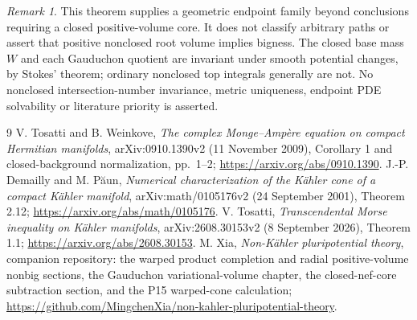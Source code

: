 \documentclass[11pt]{article}
\theoremstyle{remark}\newtheorem{remark}[theorem]{Remark}
\begin{document}
\begin{remark}
This theorem supplies a geometric endpoint family beyond conclusions
requiring a closed positive-volume core. It does not classify arbitrary
paths or assert that positive nonclosed root volume implies bigness.
The closed base mass $W$ and each Gauduchon quotient are invariant under
smooth potential changes, by Stokes' theorem; ordinary nonclosed top
integrals generally are not. No nonclosed intersection-number invariance, metric uniqueness,
endpoint PDE solvability or literature priority is asserted.
\end{remark}
\begin{thebibliography}{9}
 V. Tosatti and B. Weinkove, \emph{The complex Monge--Amp\`ere
equation on compact Hermitian manifolds}, arXiv:0910.1390v2
(11 November 2009), Corollary 1 and closed-background normalization,
pp.~1--2; \url{https://arxiv.org/abs/0910.1390}.
 J.-P. Demailly and M. P\u{a}un,
\emph{Numerical characterization of the K\"ahler cone of a compact
K\"ahler manifold}, arXiv:math/0105176v2 (24 September 2001),
Theorem 2.12; \url{https://arxiv.org/abs/math/0105176}.
 V. Tosatti, \emph{Transcendental Morse inequality on
K\"ahler manifolds}, arXiv:2608.30153v2 (8 September 2026),
Theorem 1.1; \url{https://arxiv.org/abs/2608.30153}.
 M. Xia, \emph{Non-K\"ahler pluripotential theory},
companion repository: the warped product completion and radial
positive-volume nonbig sections, the Gauduchon variational-volume chapter,
the closed-nef-core subtraction section, and the P15 warped-cone calculation;
\url{https://github.com/MingchenXia/non-kahler-pluripotential-theory}.
\end{thebibliography}
\end{document}
